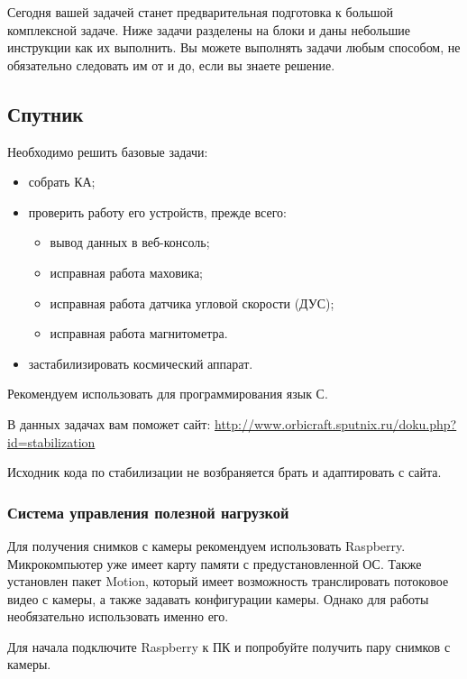
Сегодня вашей задачей станет предварительная подготовка к большой комплексной задаче. Ниже задачи разделены на блоки и даны небольшие инструкции как их выполнить. Вы можете выполнять задачи любым способом, не обязательно следовать им от и до, если вы знаете решение.

\subsection*{Спутник}

Необходимо решить базовые задачи: 
\begin{itemize}
    \item собрать КА;
    \item проверить работу его устройств, прежде всего:
    \begin{itemize}
        \item вывод данных в веб-консоль;
        \item исправная работа маховика;
        \item исправная работа датчика угловой скорости (ДУС);
        \item исправная работа магнитометра.
    \end{itemize}
    \item застабилизировать космический аппарат. 
\end{itemize}

Рекомендуем использовать для программирования язык С.

В данных задачах вам поможет сайт: \url{http://www.orbicraft.sputnix.ru/doku.php?id=stabilization}

Исходник кода по стабилизации не возбраняется брать и адаптировать с сайта.

\subsubsection*{Система управления полезной нагрузкой}

Для получения снимков с камеры рекомендуем использовать Raspberry. Микрокомпьютер уже имеет карту памяти с предустановленной ОС. Также установлен пакет Motion, который имеет возможность транслировать потоковое видео с камеры, а также задавать конфигурации камеры. Однако для работы необязательно использовать именно его.

Для начала подключите Raspberry к ПК и попробуйте получить пару снимков с камеры.

